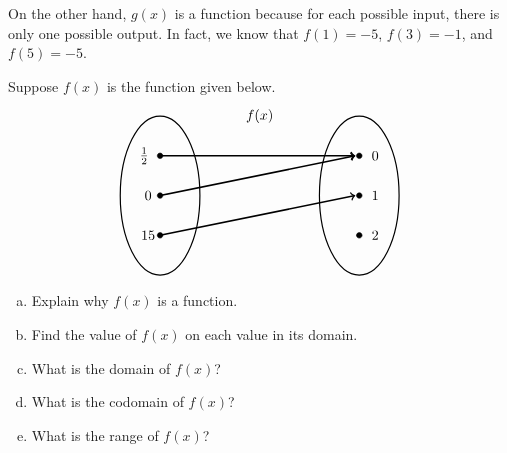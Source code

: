 \documentclass[11pt,letterpaper]{article}
\begin{document}
On the other hand, $g(x)$ is a function because for each possible input, there is only one possible output. In fact, we know that $f(1)= -5$, $f(3)= -1$, and $f(5)= -5$. 



\newpage



 Suppose $f(x)$ is the function given below.
	\[
	\begin{tikzpicture}
	\node at (2.5,2) {$f(x)$};
	\draw[line width=0.03cm] (0,0) circle (1 and 2);
	\draw[line width=0.03cm] (5,0) circle (1 and 2);
	
	\draw[fill=black] (0,1) circle (0.07);
	\draw[fill=black] (0,0) circle (0.07);
	\draw[fill=black] (0,-1) circle (0.07);
	
	\draw[fill=black] (5,1) circle (0.07);
	\draw[fill=black] (5,0) circle (0.07);
	\draw[fill=black] (5,-1) circle (0.07);
	
	\draw[line width=0.04cm,->] (0,1) -- (4.9,1);
	\draw[line width=0.04cm,->] (0,0) -- (4.9,1);
	\draw[line width=0.04cm,->] (0,-1) -- (4.9,0);
	
	\node at (-0.4,1) {$\frac{1}{2}$};
	\node at (-0.3,0) {$0$};
	\node at (-0.3,-1) {$15$};
	
	\node at (5.4,1) {$0$};
	\node at (5.4,0) {$1$};
	\node at (5.4,-1) {$2$};
	\end{tikzpicture}
	\]

\begin{enumerate}[(a)]
\item Explain why $f(x)$ is a function.
\item Find the value of $f(x)$ on each value in its domain. 
\item What is the domain of $f(x)$?
\item What is the codomain of $f(x)$?
\item What is the range of $f(x)$?
\end{enumerate} \pspace
\end{document}
